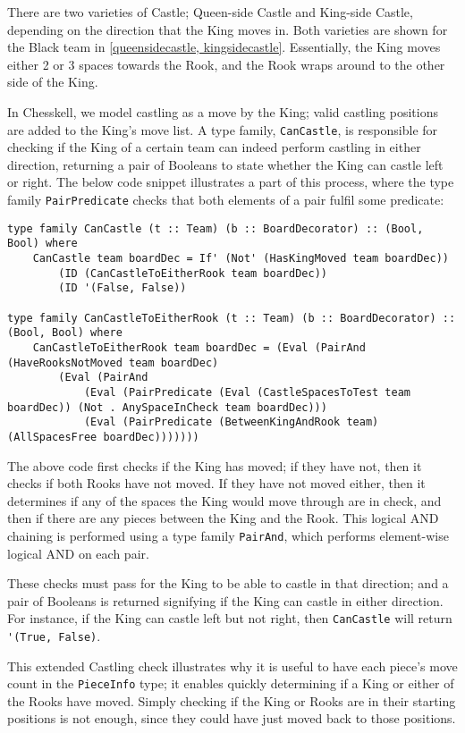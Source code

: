 \documentclass[12pt, a4paper, bibliography=totocnumbered]{scrreprt}
\newcommand{\inline}[1]{\lstinline[basicstyle=\ttfamily\footnotesize]{#1}}
\begin{document}
There are two varieties of Castle; Queen-side Castle and King-side Castle, depending on the direction that the King moves in. Both varieties are shown for the Black team in \cref{queensidecastle, kingsidecastle}. Essentially, the King moves either 2 or 3 spaces towards the Rook, and the Rook wraps around to the other side of the King.

In Chesskell, we model castling as a move by the King; valid castling positions are added to the King's move list. A type family, \inline{CanCastle}, is responsible for checking if the King of a certain team can indeed perform castling in either direction, returning a pair of Booleans to state whether the King can castle left or right. The below code snippet illustrates a part of this process, where the type family \inline{PairPredicate} checks that both elements of a pair fulfil some predicate:

\begin{lstlisting}
type family CanCastle (t :: Team) (b :: BoardDecorator) :: (Bool, Bool) where
    CanCastle team boardDec = If' (Not' (HasKingMoved team boardDec))
        (ID (CanCastleToEitherRook team boardDec))
        (ID '(False, False))

type family CanCastleToEitherRook (t :: Team) (b :: BoardDecorator) :: (Bool, Bool) where
    CanCastleToEitherRook team boardDec = (Eval (PairAnd (HaveRooksNotMoved team boardDec)
        (Eval (PairAnd
            (Eval (PairPredicate (Eval (CastleSpacesToTest team boardDec)) (Not . AnySpaceInCheck team boardDec)))
            (Eval (PairPredicate (BetweenKingAndRook team) (AllSpacesFree boardDec)))))))
\end{lstlisting}

The above code first checks if the King has moved; if they have not, then it checks if both Rooks have not moved. If they have not moved either, then it determines if any of the spaces the King would move through are in check, and then if there are any pieces between the King and the Rook. This logical AND chaining is performed using a type family \inline{PairAnd}, which performs element-wise logical AND on each pair.

These checks must pass for the King to be able to castle in that direction; and a pair of Booleans is returned signifying if the King can castle in either direction. For instance, if the King can castle left but not right, then \inline{CanCastle} will return \inline{'(True, False)}.

This extended Castling check illustrates why it is useful to have each piece's move count in the \inline{PieceInfo} type; it enables quickly determining if a King or either of the Rooks have moved. Simply checking if the King or Rooks are in their starting positions is not enough, since they could have just moved back to those positions.
\end{document}
